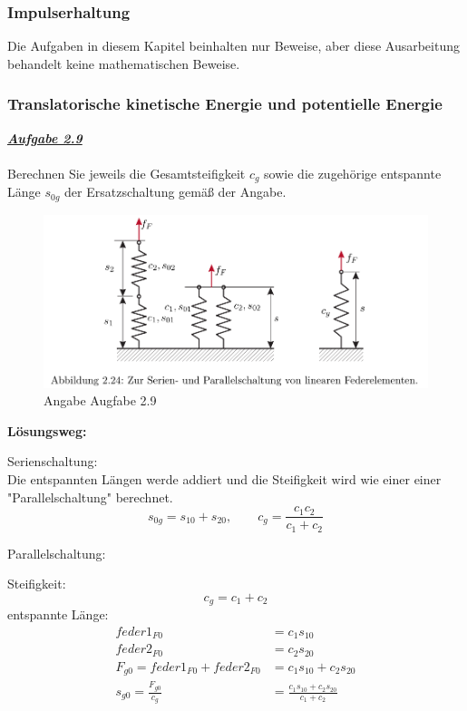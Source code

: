 \documentclass[a4paper,12p]{article}
\begin{document}
\subsubsection{Impulserhaltung}
Die Aufgaben in diesem Kapitel beinhalten nur Beweise, aber diese Ausarbeitung behandelt keine mathematischen Beweise.
\subsubsection{Translatorische kinetische Energie und potentielle Energie  }
\underline{\textbf{\textit{Aufgabe 2.9}}} \\ \\
Berechnen Sie jeweils die Gesamtsteifigkeit $c_{g}$ sowie die zugehörige entspannte Länge $s_{0g}$ der Ersatzschaltung gemäß der Angabe.
\begin{figure}[h]
	\begin{center}
		\includegraphics[width=12.5cm]{pic/Angabe2_9}
		\caption{Angabe Augfabe 2.9}
		\label{Aufgabe 2.9}
	\end{center}
\end{figure}
\newpage
\begin{flushleft}
	\textbf{Lösungsweg:}
\end{flushleft}
Serienschaltung:\\
Die entspannten Längen werde addiert und die Steifigkeit wird wie einer einer "Parallelschaltung" berechnet.
\[
	s_{0g} = s_{10} + s_{20}, \qquad c_{g} = \frac{c_{1}c_{2}}{c_{1} + c_{2}}
\]
\begin{flushleft}
Parallelschaltung:
\end{flushleft}
Steifigkeit:
\[ c_{g} = c_{1} + c_{2}\]
entspannte Länge:
\begin{align*}
	feder1_{F0} &= c_{1}s_{10} \\
	feder2_{F0} &= c_{2}s_{20} \\
	F_{g0} = feder1_{F0} + feder2_{F0} &= c_{1}s_{10} + c_{2}s_{20} \\
	s_{g0} = \frac{F_{g0}}{c_{g}} &= \frac{c_{1}s_{10} + c_{2}s_{20}}{c_{1} + c_{2}}
\end{align*}
\end{document}
